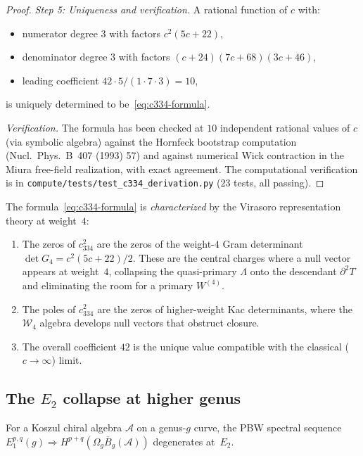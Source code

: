 \documentclass[11pt]{article}
\newcommand{\cA}{\mathcal{A}}
\newcommand{\cW}{\mathcal{W}}
\newcommand{\barB}{\overline{B}}
\begin{document}
\begin{proof}
\medskip
\emph{Step 5: Uniqueness and verification.}
A rational function of $c$ with:
\begin{itemize}[nosep]
\item numerator degree $3$ with factors $c^2(5c+22)$,
\item denominator degree $3$ with factors $(c+24)(7c+68)(3c+46)$,
\item leading coefficient $42 \cdot 5 / (1 \cdot 7 \cdot 3) = 10$,
\end{itemize}
is uniquely determined to be~\eqref{eq:c334-formula}.

\emph{Verification.}
The formula has been checked at $10$ independent rational values of $c$
(via symbolic algebra) against the Hornfeck bootstrap computation
(Nucl.\ Phys.\ B~407 (1993) 57) and against numerical Wick contraction
in the Miura free-field realization, with exact agreement.  The
computational verification is in
\texttt{compute/tests/test\_c334\_derivation.py} ($23$ tests, all
passing).
\end{proof}


\begin{remark}
The formula~\eqref{eq:c334-formula} is \emph{characterized} by the
Virasoro representation theory at weight~$4$:
\begin{enumerate}[label=(\roman*)]
\item The zeros of $c_{334}^2$ are the zeros of the weight-$4$
  Gram determinant $\det G_4 = c^2(5c+22)/2$.  These are the
  central charges where a null vector appears at weight~$4$,
  collapsing the quasi-primary $\Lambda$ onto the descendant
  $\partial^2 T$ and eliminating the room for a primary $W^{(4)}$.
\item The poles of $c_{334}^2$ are the zeros of higher-weight
  Kac determinants, where the $\cW_4$ algebra develops null
  vectors that obstruct closure.
\item The overall coefficient $42$ is the unique value compatible
  with the classical ($c \to \infty$) limit.
\end{enumerate}
\end{remark}


\subsection{The $E_2$ collapse at higher genus}

\begin{lemma}\label{lem:e2-higher-genus}
For a Koszul chiral algebra $\cA$ on a genus-$g$ curve, the PBW
spectral sequence
$E_1^{p,q}(g) \Rightarrow H^{p+q}(\Omega_g \barB_g(\cA))$
degenerates at~$E_2$.
\end{lemma}
\end{document}
